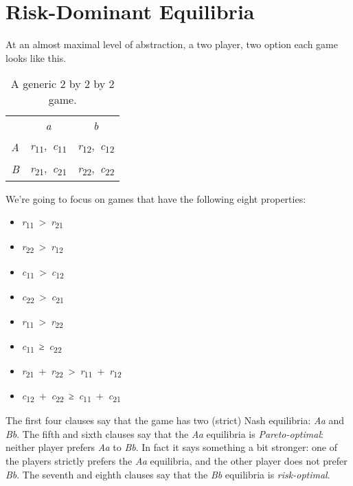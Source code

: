 \documentclass[
  12pt,
  letterpaper,
]{scrbook}
\providecommand{\tightlist}{%
  \setlength{\itemsep}{0pt}\setlength{\parskip}{0pt}}\usepackage{longtable,booktabs,array}
\begin{document}
\section{Risk-Dominant Equilibria}\label{sec-globalgame}

At an almost maximal level of abstraction, a two player, two option each
game looks like this.

\begin{longtable}[]{@{}rcc@{}}
\caption{A generic 2 by 2 by 2
game.}\label{tbl-generic-game}\tabularnewline
\toprule\noalign{}
\endfirsthead
\endhead
\bottomrule\noalign{}
\endlastfoot
& \emph{a} & \emph{b} \\
\emph{A} & \emph{r}\textsubscript{11},~\emph{c}\textsubscript{11} &
\emph{r}\textsubscript{12},~\emph{c}\textsubscript{12} \\
\emph{B} & \emph{r}\textsubscript{21},~\emph{c}\textsubscript{21} &
\emph{r}\textsubscript{22},~\emph{c}\textsubscript{22} \\
\end{longtable}

We're going to focus on games that have the following eight properties:

\begin{itemize}
\tightlist
\item
  \emph{r}\textsubscript{11}~\textgreater~\emph{r}\textsubscript{21}
\item
  \emph{r}\textsubscript{22}~\textgreater~\emph{r}\textsubscript{12}
\item
  \emph{c}\textsubscript{11}~\textgreater~\emph{c}\textsubscript{12}
\item
  \emph{c}\textsubscript{22}~\textgreater~\emph{c}\textsubscript{21}
\item
  \emph{r}\textsubscript{11}~\textgreater~\emph{r}\textsubscript{22}
\item
  \emph{c}\textsubscript{11}~≥~\emph{c}\textsubscript{22}
\item
  \emph{r}\textsubscript{21}~+~\emph{r}\textsubscript{22}~\textgreater~\emph{r}\textsubscript{11}~+~\emph{r}\textsubscript{12}
\item
  \emph{c}\textsubscript{12}~+~\emph{c}\textsubscript{22}~≥~\emph{c}\textsubscript{11}~+~\emph{c}\textsubscript{21}
\end{itemize}

The first four clauses say that the game has two (strict) Nash
equilibria: \emph{Aa} and \emph{Bb}. The fifth and sixth clauses say
that the \emph{Aa} equilibria is \emph{Pareto-optimal}: neither player
prefers \emph{Aa} to \emph{Bb}. In fact it says something a bit
stronger: one of the players strictly prefers the \emph{Aa} equilibria,
and the other player does not prefer \emph{Bb}. The seventh and eighth
clauses say that the \emph{Bb} equilibria is \emph{risk-optimal}.
\end{document}
